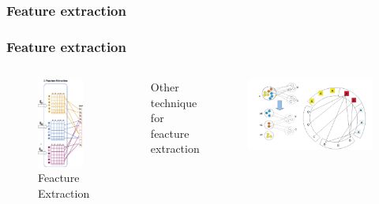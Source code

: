 \documentclass{beamer}
\numberwithin{figure}{section}
\numberwithin{equation}{section}
\begin{document}
\subsubsection{Feature extraction  }
\begin{frame} \scriptsize \justifying
 \frametitle{Feature extraction}
   \begin{columns}[c] 
 	\begin{figure}[p]
  		\centering
  		\includegraphics[width=0.7\textwidth]{pictures/feacture_extraction}
  		\caption{\tiny Feacture Extraction}
  		\label{fig:feacture_extraction}
 	\end{figure}
    Other technique for feacture extraction\cite{Aufaure2012}
    \begin{figure}[p]
  		\centering
  		\includegraphics[width=1.0\linewidth]{pictures/ksnap}

\end{figure}
\end{columns}
\end{frame}
\end{document}
